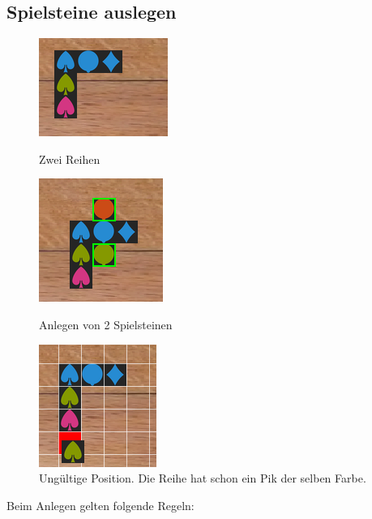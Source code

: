 \documentclass[a4paper, ngerman]{scrartcl}
\begin{document}
\subsection{Spielsteine auslegen}
\begin{figure}
	\centering
	\begin{subfigures}
		\includegraphics[scale = 0.7]{images/anlegen01}
		\caption{Zwei Reihen}
		\label{fig:Anlegen01}
		\vspace{8pt}
		
		\includegraphics[scale = 0.7]{images/anlegen04}
		\caption{Anlegen von 2 Spielsteinen}
		\label{fig:Anlegen02}
		\vspace{8pt}
		
		\includegraphics[scale = 0.7]{images/anlegen02}
		\caption{Ungültige Position. Die Reihe hat schon ein Pik der selben Farbe.}
		\label{fig:Anlegen03}
	\end{subfigures}	
\end{figure}
Beim Anlegen gelten folgende Regeln:
\end{document}
